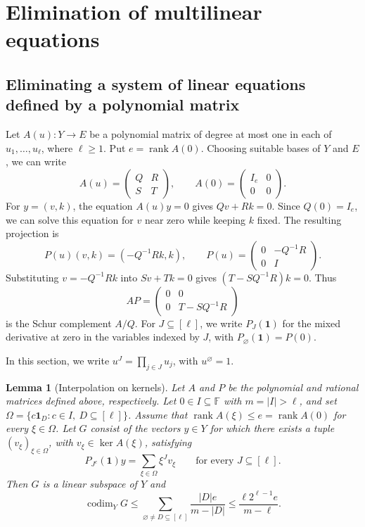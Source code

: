 \documentclass[11pt,reqno]{amsart}
\theoremstyle{plain}
\newtheorem{lemma}[theorem]{Lemma}
\theoremstyle{definition}
\newcommand{\F}{\mathbb F}
\DeclareMathOperator{\codim}{codim}
\DeclareMathOperator{\rk}{rank}
\begin{document}
\section{Elimination of multilinear equations}\label{sec:eliminate}
\subsection{Eliminating a system of linear equations defined by a polynomial matrix}\label{subsec:kernel}

Let $A(u)\colon Y\to E$ be a polynomial matrix of degree at most one in
each of $u_1,\ldots,u_\ell$, where $\ell\geq1$. Put $e=\rk A(0)$.
Choosing suitable bases of $Y$ and $E$, we can write
\[
 A(u)=\begin{pmatrix}Q&R\\ S&T\end{pmatrix},\qquad
 A(0)=\begin{pmatrix}I_e&0\\0&0\end{pmatrix}.
\]
For $y=(v,k)$, the equation $A(u)y=0$ gives $Qv+Rk=0$.
Since $Q(0)=I_e$, we can solve this equation for $v$ near zero while keeping $k$
fixed. The resulting projection is
\begin{equation}\label{eq:kernel-projector}
 P(u)(v,k)=(-Q^{-1}Rk,k),\qquad
 P(u)=\begin{pmatrix}0&-Q^{-1}R\\0&I\end{pmatrix}.
\end{equation}
Substituting $v=-Q^{-1}Rk$ into $Sv+Tk=0$ gives $(T-SQ^{-1}R)k=0$. Thus
\[
 AP=\begin{pmatrix}0&0\\ 0&T-SQ^{-1}R\end{pmatrix}
\]
is the Schur complement $A/Q$.
For $J\subseteq[\ell]$,
we write $P_J(\mathbf 1)$ for the mixed derivative at zero in the variables indexed by $J$, with $P_\varnothing(\mathbf 1)=P(0)$.

In this section, we write
$u^J=\prod_{j\in J}u_j$, with $u^\varnothing=1$.

\begin{lemma}[Interpolation on kernels]\label{lem:kernel-interpolation}
Let $A$ and $P$ be the polynomial and rational matrices defined above, respectively. Let $0\in I\subseteq\F$ with $m=|I|>\ell$, and set $\Omega=\{c\mathbf 1_D:c\in I,\ D\subseteq[\ell]\}$. Assume that $\rk A(\xi)\leq e=\rk A(0)$ for every $\xi\in\Omega$. Let $G$ consist of the vectors $y\in Y$ for which there exists a tuple
$(v_\xi)_{\xi\in\Omega}$, with $v_\xi\in\ker A(\xi)$, satisfying
\begin{equation}\label{eq:kernel-moments}
 P_{J^c}(\mathbf 1)y=\sum_{\xi\in\Omega}\xi^J v_\xi
 \qquad\text{for every }J\subseteq[\ell].
\end{equation}
Then $G$ is a linear subspace of $Y$ and
\begin{equation}\label{eq:kernel-codim}
 \codim_Y G\leq
 \sum_{\varnothing\ne D\subseteq[\ell]}\frac{|D|e}{m-|D|}
 \leq\frac{\ell 2^{\ell-1}e}{m-\ell}.
\end{equation}
\end{lemma}
\end{document}
